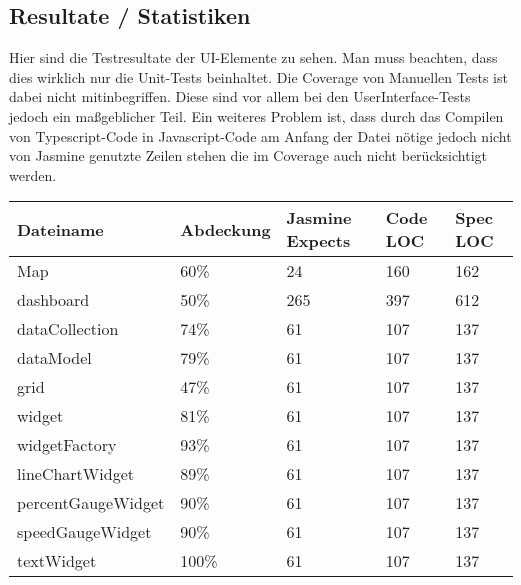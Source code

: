 \documentclass[qualitaetssicherung.tex]{subfiles}
\begin{document}
\subsection*{Resultate / Statistiken}
	Hier sind die Testresultate der UI-Elemente zu sehen.
	Man muss beachten, dass dies wirklich nur die Unit-Tests beinhaltet. Die Coverage von Manuellen Tests ist dabei nicht mitinbegriffen. Diese sind vor allem bei den UserInterface-Tests jedoch ein maßgeblicher Teil.
	Ein weiteres Problem ist, dass durch das Compilen von Typescript-Code in Javascript-Code am Anfang der Datei nötige jedoch nicht von Jasmine genutzte Zeilen stehen die im Coverage auch nicht berücksichtigt werden.
	\begin{center}
		\begin{tabular}{| l | l | l | l | l |}
			\hline
			Dateiname & Abdeckung & Jasmine Expects & Code LOC & Spec LOC\\ \hline
			Map 			&  60\% & 24 & 160 & 162\\ \hline
			dashboard 		&  50\% & 265 & 397 & 612 \\ \hline
			dataCollection 	&  74\% & 61 & 107 & 137\\ \hline
			dataModel    	&  79\% & 61 & 107 & 137\\ \hline
			grid		 	&  47\% & 61 & 107 & 137\\ \hline
			widget		 	&  81\% & 61 & 107 & 137\\ \hline
			widgetFactory 	&  93\% & 61 & 107 & 137\\ \hline
			lineChartWidget &  89\% & 61 & 107 & 137\\ \hline
			percentGaugeWidget 	&  90\% & 61 & 107 & 137\\ \hline
			speedGaugeWidget 	&  90\% & 61 & 107 & 137\\ \hline
			textWidget  	& 100\% & 61 & 107 & 137\\ \hline
			\hline
		\end{tabular}
	\end{center}
	
\end{document}
